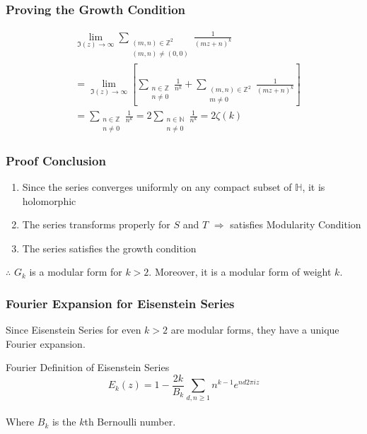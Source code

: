 \documentclass{beamer}
\begin{document}
\begin{frame}
\frametitle{Proving the Growth Condition}
\begin{align*}
& \lim_{\Im(z) \to \infty} \sum_{\substack{(m,n) \in \mathbb{Z}^2 \\ (m,n) \neq (0,0)}}  \frac{1}{(m z + n)^k} \\
& = \lim_{\Im(z) \to \infty} \left[ \sum_{\substack{n \in \mathbb{Z} \\ n \neq 0}} \frac{1}{n^k} + \sum_{\substack{(m,n) \in \mathbb{Z}^2 \\ m \neq 0}}  \frac{1}{(m z + n)^k} \right] \\
& = \sum_{\substack{n \in \mathbb{Z} \\ n \neq 0}} \frac{1}{n^k} = 2 \sum_{\substack{n \in \mathbb{N} \\ n \neq 0}} \frac{1}{n^k}  = 2\zeta(k)
\end{align*}
\end{frame}

\begin{frame}
\frametitle{Proof Conclusion}
\begin{enumerate}
\item Since the series converges uniformly on any compact subset of $\mathbb{H}$, it is holomorphic
\item The series transforms properly for $S$ and $T$ $\Rightarrow$ satisfies Modularity Condition
\item The series satisfies the growth condition
\end{enumerate}


$\therefore$ $G_k$ is a modular form for $k > 2$. Moreover, it is a modular form of weight $k$.

\end{frame}

\begin{frame}
\frametitle{Fourier Expansion for Eisenstein Series}
Since Eisenstein Series for even $k>2$ are modular forms, they have a unique Fourier expansion. 
\begin{block}{Fourier Definition of Eisenstein Series}
$$E_k(z) = 1 - \frac{2k}{B_k} \sum_{d,n \geq 1} n^{k-1} e^{nd2\pi iz} $$\\
Where $B_k$ is the $k$th Bernoulli number.
\end{block}
\end{frame}
\end{document}
